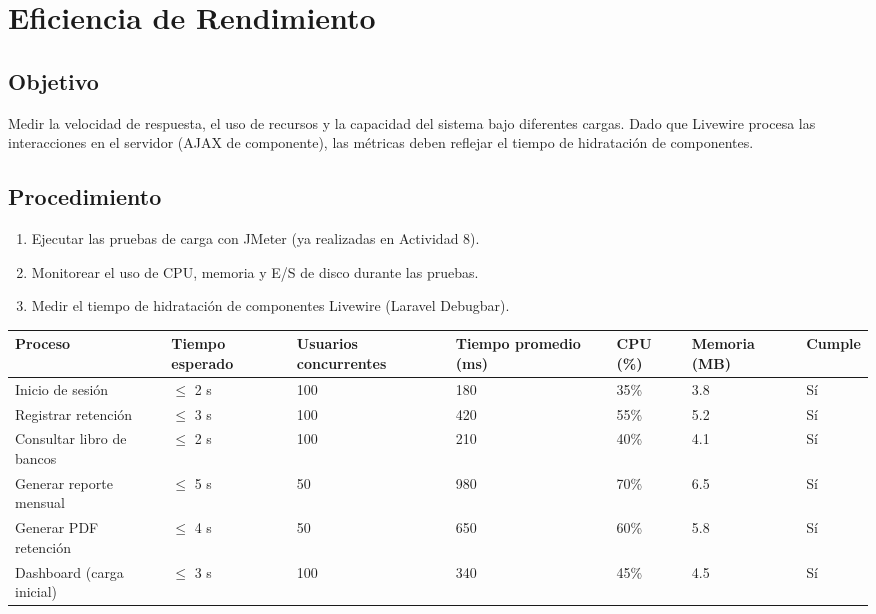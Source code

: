 \documentclass[stu]{apa7}
\begin{document}
\section{Eficiencia de Rendimiento}

\subsection{Objetivo}

Medir la velocidad de respuesta, el uso de recursos y la capacidad del sistema bajo diferentes cargas. Dado que Livewire procesa las interacciones en el servidor (AJAX de componente), las métricas deben reflejar el tiempo de hidratación de componentes.

\subsection{Procedimiento}

\begin{enumerate}
    \item Ejecutar las pruebas de carga con JMeter (ya realizadas en Actividad 8).
    \item Monitorear el uso de CPU, memoria y E/S de disco durante las pruebas.
    \item Medir el tiempo de hidratación de componentes Livewire (Laravel Debugbar).
\end{enumerate}

\begin{longtable}{|L{3.5cm}|C{1.5cm}|C{1.5cm}|C{1.5cm}|C{1.5cm}|C{1.5cm}|C{1.5cm}|}
\hline
{}
\textbf{Proceso} & \textbf{Tiempo esperado} & \textbf{Usuarios concurrentes} & \textbf{Tiempo promedio (ms)} & \textbf{CPU (\%)} & \textbf{Memoria (MB)} & \textbf{Cumple} \\
\hline
Inicio de sesión & $\leq$ 2 s & 100 & 180 & 35\% & 3.8 & Sí \\
\hline
Registrar retención & $\leq$ 3 s & 100 & 420 & 55\% & 5.2 & Sí \\
\hline
Consultar libro de bancos & $\leq$ 2 s & 100 & 210 & 40\% & 4.1 & Sí \\
\hline
Generar reporte mensual & $\leq$ 5 s & 50 & 980 & 70\% & 6.5 & Sí \\
\hline
Generar PDF retención & $\leq$ 4 s & 50 & 650 & 60\% & 5.8 & Sí \\
\hline
Dashboard (carga inicial) & $\leq$ 3 s & 100 & 340 & 45\% & 4.5 & Sí \\
\hline
\end{longtable}
\end{document}
